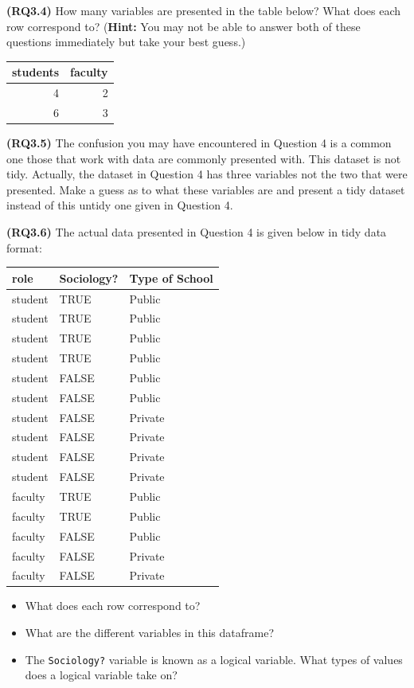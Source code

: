 \documentclass[]{tufte-book}
\providecommand{\tightlist}{%
  \setlength{\itemsep}{0pt}\setlength{\parskip}{0pt}}
\begin{document}
\textbf{(RQ3.4)} How many variables are presented in the table below?
What does each row correspond to? (\textbf{Hint:} You may not be able to
answer both of these questions immediately but take your best guess.)

\begin{tabular}{r|r}
\hline
students & faculty\\
\hline
4 & 2\\
\hline
6 & 3\\
\hline
\end{tabular}

\textbf{(RQ3.5)} The confusion you may have encountered in Question 4 is
a common one those that work with data are commonly presented with. This
dataset is not tidy. Actually, the dataset in Question 4 has three
variables not the two that were presented. Make a guess as to what these
variables are and present a tidy dataset instead of this untidy one
given in Question 4.

\textbf{(RQ3.6)} The actual data presented in Question 4 is given below
in tidy data format:

\begin{tabular}{l|l|l}
\hline
role & Sociology? & Type of School\\
\hline
student & TRUE & Public\\
\hline
student & TRUE & Public\\
\hline
student & TRUE & Public\\
\hline
student & TRUE & Public\\
\hline
student & FALSE & Public\\
\hline
student & FALSE & Public\\
\hline
student & FALSE & Private\\
\hline
student & FALSE & Private\\
\hline
student & FALSE & Private\\
\hline
student & FALSE & Private\\
\hline
faculty & TRUE & Public\\
\hline
faculty & TRUE & Public\\
\hline
faculty & FALSE & Public\\
\hline
faculty & FALSE & Private\\
\hline
faculty & FALSE & Private\\
\hline
\end{tabular}

\begin{itemize}
\tightlist
\item
  What does each row correspond to?\\
\item
  What are the different variables in this dataframe?\\
\item
  The \texttt{Sociology?} variable is known as a logical variable. What
  types of values does a logical variable take on?
\end{itemize}
\end{document}

